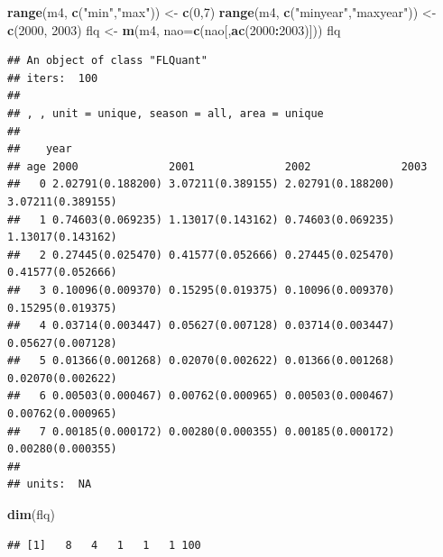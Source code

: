 \documentclass[
]{book}
\newenvironment{Shaded}{\begin{snugshade}}{\end{snugshade}}
\newcommand{\AttributeTok}[1]{\textcolor[rgb]{0.13,0.29,0.53}{#1}}
\newcommand{\DecValTok}[1]{\textcolor[rgb]{0.00,0.00,0.81}{#1}}
\newcommand{\FunctionTok}[1]{\textcolor[rgb]{0.13,0.29,0.53}{\textbf{#1}}}
\newcommand{\NormalTok}[1]{#1}
\newcommand{\OtherTok}[1]{\textcolor[rgb]{0.56,0.35,0.01}{#1}}
\newcommand{\SpecialCharTok}[1]{\textcolor[rgb]{0.81,0.36,0.00}{\textbf{#1}}}
\newcommand{\StringTok}[1]{\textcolor[rgb]{0.31,0.60,0.02}{#1}}
\begin{document}
\begin{Shaded}
\begin{Highlighting}[]
\FunctionTok{range}\NormalTok{(m4, }\FunctionTok{c}\NormalTok{(}\StringTok{"min"}\NormalTok{,}\StringTok{"max"}\NormalTok{)) }\OtherTok{\textless{}{-}} \FunctionTok{c}\NormalTok{(}\DecValTok{0}\NormalTok{,}\DecValTok{7}\NormalTok{)}
\FunctionTok{range}\NormalTok{(m4, }\FunctionTok{c}\NormalTok{(}\StringTok{"minyear"}\NormalTok{,}\StringTok{"maxyear"}\NormalTok{)) }\OtherTok{\textless{}{-}} \FunctionTok{c}\NormalTok{(}\DecValTok{2000}\NormalTok{, }\DecValTok{2003}\NormalTok{)}
\NormalTok{flq }\OtherTok{\textless{}{-}} \FunctionTok{m}\NormalTok{(m4, }\AttributeTok{nao=}\FunctionTok{c}\NormalTok{(nao[,}\FunctionTok{ac}\NormalTok{(}\DecValTok{2000}\SpecialCharTok{:}\DecValTok{2003}\NormalTok{)]))}
\NormalTok{flq}
\end{Highlighting}
\end{Shaded}

\begin{verbatim}
## An object of class "FLQuant"
## iters:  100 
## 
## , , unit = unique, season = all, area = unique
## 
##    year
## age 2000              2001              2002              2003             
##   0 2.02791(0.188200) 3.07211(0.389155) 2.02791(0.188200) 3.07211(0.389155)
##   1 0.74603(0.069235) 1.13017(0.143162) 0.74603(0.069235) 1.13017(0.143162)
##   2 0.27445(0.025470) 0.41577(0.052666) 0.27445(0.025470) 0.41577(0.052666)
##   3 0.10096(0.009370) 0.15295(0.019375) 0.10096(0.009370) 0.15295(0.019375)
##   4 0.03714(0.003447) 0.05627(0.007128) 0.03714(0.003447) 0.05627(0.007128)
##   5 0.01366(0.001268) 0.02070(0.002622) 0.01366(0.001268) 0.02070(0.002622)
##   6 0.00503(0.000467) 0.00762(0.000965) 0.00503(0.000467) 0.00762(0.000965)
##   7 0.00185(0.000172) 0.00280(0.000355) 0.00185(0.000172) 0.00280(0.000355)
## 
## units:  NA
\end{verbatim}

\begin{Shaded}
\begin{Highlighting}[]
\FunctionTok{dim}\NormalTok{(flq)}
\end{Highlighting}
\end{Shaded}

\begin{verbatim}
## [1]   8   4   1   1   1 100
\end{verbatim}
\end{document}
